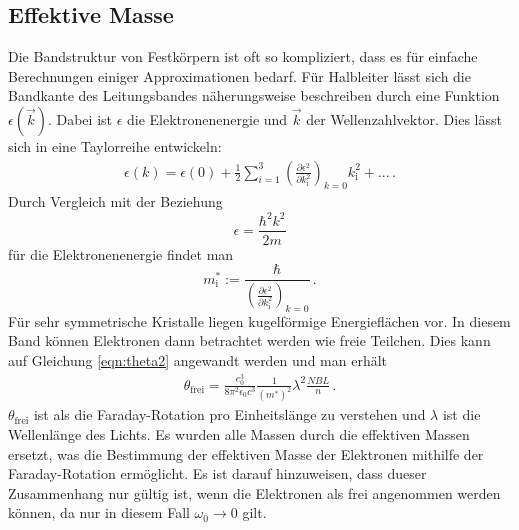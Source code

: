 \subsection{Effektive Masse}
\label{subsec:effmass}
Die Bandstruktur von Festkörpern ist oft so kompliziert, dass es für einfache Berechnungen
einiger Approximationen bedarf. Für Halbleiter lässt sich die Bandkante des Leitungsbandes
näherungsweise beschreiben durch eine Funktion $\epsilon(\vec{k})$. Dabei ist
$\epsilon$ die Elektronenenergie und $\vec{k}$ der Wellenzahlvektor. Dies lässt sich
in eine Taylorreihe entwickeln:
\begin{align}
  \epsilon(k) = \epsilon (0) + \frac{1}{2} \sum_{i=1}^3 \left(\frac{\partial \epsilon^2}{\partial k^2_{\mathrm{i}}}\right)_{k=0} k_{\mathrm{i}}^2 + ... \,.
  \label{eqn:taylor}
\end{align}
Durch Vergleich mit der Beziehung
\begin{equation}
  \epsilon = \frac{\hbar^2 k^2}{2m}
  \label{eqn:elektronenergie}
\end{equation}
für die Elektronenenergie findet man
\begin{equation}
   m^*_{\mathrm{i}} := \frac{\hbar}{\left(\frac{\partial \epsilon^2}{\partial k^2_{\mathrm{i}}}\right)_{k=0}} \,.
   \label{eqn:effmass}
\end{equation}
Für sehr symmetrische Kristalle liegen kugelförmige Energieflächen vor. In diesem
Band können Elektronen dann betrachtet werden wie freie Teilchen. Dies kann auf
Gleichung \ref{eqn:theta2} angewandt werden und man erhält
\begin{align}
  \theta_{\mathrm{frei}} = \frac{e^3_0}{8 \pi^2 \epsilon_0 c^3}\frac{1}{\left(m^{*}\right)^2} \lambda^2 \frac{NBL}{n} \,.
  \label{eqn:theta_frei}
\end{align}
$\theta_{\mathrm{frei}}$ ist als die Faraday-Rotation pro Einheitslänge zu verstehen und
$\lambda$ ist die Wellenlänge des Lichts. Es wurden alle Massen durch die effektiven
Massen ersetzt, was die Bestimmung der effektiven Masse der Elektronen mithilfe der
Faraday-Rotation ermöglicht. Es ist darauf hinzuweisen, dass dueser Zusammenhang nur
gültig ist, wenn die Elektronen als frei angenommen werden können, da nur in diesem
Fall $\omega_0 \rightarrow 0$ gilt.
